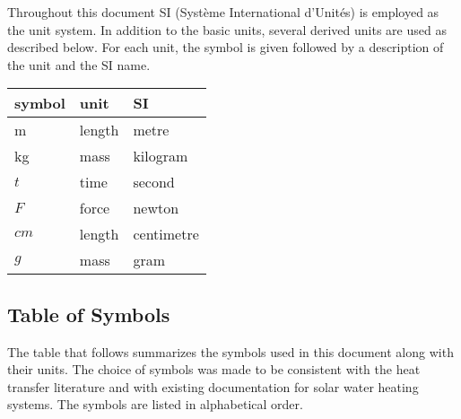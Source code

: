 \documentclass[12pt]{article}
\begin{document}
Throughout this document SI (Syst\`{e}me International d'Unit\'{e}s) is employed
as the unit system.  In addition to the basic units, several derived units are
used as described below.  For each unit, the symbol is given followed by a
description of the unit and the SI name.
~\newline

\renewcommand{\arraystretch}{1.2}
  \noindent \begin{tabular}{l l l} 
    \toprule		
    \textbf{symbol} & \textbf{unit} & \textbf{SI}\\
    \midrule 
    \si{\metre} & length & metre\\
    \si{\kilogram} & mass	& kilogram\\
    $t$ & time & second\\
    $F$ & force & newton\\
    $cm$ & length & centimetre\\
    $g$ & mass & gram \\
    \bottomrule
  \end{tabular}


\subsection{Table of Symbols}

The table that follows summarizes the symbols used in this document along with
their units.  The choice of symbols was made to be consistent with the heat
transfer literature and with existing documentation for solar water heating
systems.  The symbols are listed in alphabetical order.
\end{document}
